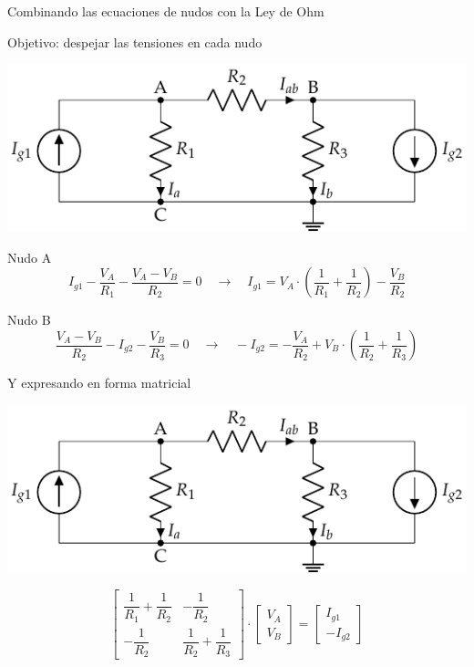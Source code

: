 \documentclass[aspectratio=169, xcolor={usenames,svgnames,dvipsnames}]{beamer}
\begin{document}

\begin{frame}{Combinando las ecuaciones de nudos con la Ley de Ohm}

\alert{Objetivo}: despejar las \alert{tensiones en cada nudo}
    \begin{center}
    \includegraphics[width=.7\linewidth]{../figs/nudos.pdf}
    \end{center}
    \vspace{-6mm}
    
    Nudo A
    \begin{equation*}
      I_{g1} - \dfrac{V_A}{R_1} - \dfrac{V_A - V_B}{R_2} = 0 \quad \rightarrow \quad I_{g1} = V_A\cdot\left(\dfrac{1}{R_1}+\dfrac{1}{R_2}\right) - \dfrac{V_B}{R_2} 
    \end{equation*}
    
    Nudo B
    \begin{equation*}
      \dfrac{V_A - V_B}{R_2} - I_{g2} - \dfrac{V_B}{R_3} = 0 \quad \rightarrow \quad - I_{g2} = - \dfrac{V_A}{R_2} + V_B \cdot\left(\dfrac{1}{R_2} + \dfrac{1}{R_3}\right)
    \end{equation*}
\end{frame}


\begin{frame}{Y expresando en forma matricial}
    \begin{center}
    \includegraphics[width=.7\linewidth]{../figs/nudos.pdf}
    \end{center}
    \begin{equation*}
      \begin{bmatrix}
        \dfrac{1}{R_1}+\dfrac{1}{R_2} & - \dfrac{1}{R_2}\\
        -\dfrac{1}{R_2} & \dfrac{1}{R_2}+\dfrac{1}{R_3}
      \end{bmatrix} \cdot%
      \begin{bmatrix}
        V_A\\
        V_B
      \end{bmatrix} = %
      \begin{bmatrix}
        I_{g1}\\
        -I_{g2}
      \end{bmatrix}
    \end{equation*}
\end{frame}
\end{document}

